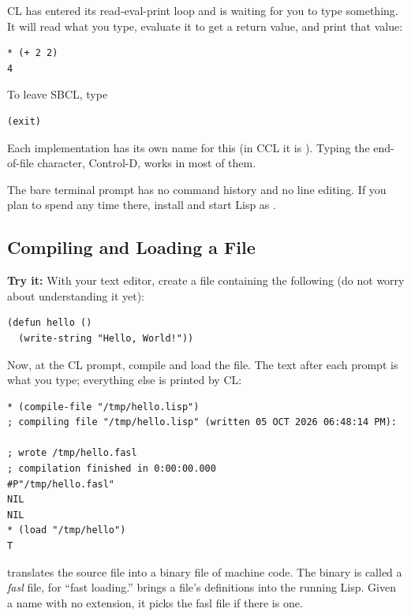 CL has entered its read-eval-print loop and is waiting for you to type
something. It will read what you type, evaluate it to get a return
value, and print that value:

\begin{verbatim}
* (+ 2 2)
4
\end{verbatim}

To leave SBCL, type

\begin{verbatim}
(exit)
\end{verbatim}

\noindent
Each implementation has its own name for this (in CCL it is
). Typing the end-of-file character, Control-D, works in
most of them.

The bare terminal prompt has no command history and no line editing.
If you plan to spend any time there, install  and start
Lisp as .

\subsection{Compiling and Loading a File}

\textbf{Try it:} With your text editor, create a file
 containing the following (do not worry about
understanding it yet):

\begin{verbatim}
(defun hello ()
  (write-string "Hello, World!"))
\end{verbatim}

Now, at the CL prompt, compile and load the file. The text after each
\code{*} prompt is what you type; everything else is printed by CL:

\begin{verbatim}
* (compile-file "/tmp/hello.lisp")
; compiling file "/tmp/hello.lisp" (written 05 OCT 2026 06:48:14 PM):

; wrote /tmp/hello.fasl
; compilation finished in 0:00:00.000
#P"/tmp/hello.fasl"
NIL
NIL
* (load "/tmp/hello")
T
\end{verbatim}

 translates the source file into a binary file of
machine code. The binary is called a \emph{fasl} file, for ``fast
loading.''  brings a file's definitions into the running
Lisp. Given a name with no extension, it picks the fasl file if there
is one.

